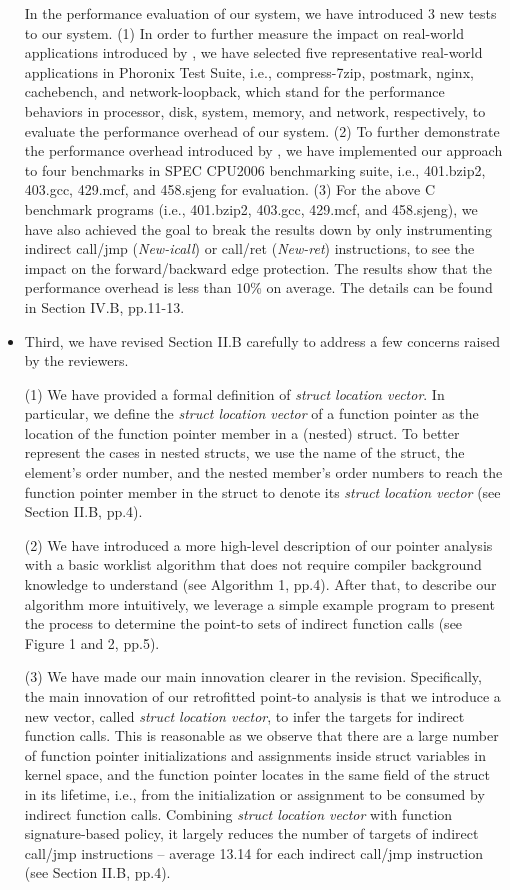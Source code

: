 \documentclass[oneside, 11pt]{article}
\begin{document}
\begin{itemize}
In the performance evaluation of our system, we have introduced 3 new
tests to our system. (1) In order to further measure the
impact on real-world applications introduced by \TheName{}, we have
selected five representative real-world applications in Phoronix Test
Suite, i.e., compress-7zip, postmark, nginx, cachebench, and network-loopback,
which stand for the performance behaviors in processor, disk, system, memory,
and network, respectively, to evaluate the performance overhead of our system.
(2) To further demonstrate the performance overhead introduced by \TheName{},
we have implemented our approach to four benchmarks in SPEC CPU2006 benchmarking
suite, i.e., 401.bzip2, 403.gcc, 429.mcf, and 458.sjeng for evaluation.
(3) For the above C benchmark programs (i.e., 401.bzip2, 403.gcc, 429.mcf, and 458.sjeng),
we have also achieved the goal to break the results down by only instrumenting
indirect call/jmp (\emph{New-icall}) or call/ret (\emph{New-ret}) instructions, to
see the impact on the forward/backward edge protection.
The results show that the performance overhead is less than $10$\% on average.
The details can be found in Section IV.B, pp.11-13.

\item %
Third, we have revised Section II.B carefully to address a few concerns raised by the reviewers.

(1) We have provided a formal definition of \emph{struct location vector}.
In particular, we define the \emph{struct location vector} of a function pointer
as the location of the function pointer member in a (nested) struct.
To better represent the cases in nested structs, we use the name of the
struct, the element's order number, and the nested member's order numbers
to reach the function pointer member in the struct to denote its
\emph{struct location vector} (see Section II.B, pp.4).

(2) We have introduced a more high-level description of our pointer
analysis with a basic worklist algorithm that does not require compiler
background knowledge to understand (see Algorithm 1, pp.4).
After that, to describe our algorithm more intuitively, we leverage a simple
example program to present the process to determine the point-to sets of
indirect function calls (see Figure 1 and 2, pp.5).

(3) We have made our main innovation clearer in the revision.
Specifically, the main innovation of our retrofitted point-to analysis is that
we introduce a new vector, called \emph{struct location vector}, to infer the
targets for indirect function calls. This is reasonable as we observe that
there are a large number of function pointer initializations and assignments inside
struct variables in kernel space, and the function pointer locates in the
same field of the struct in its lifetime, i.e., from the initialization or assignment to
be consumed by indirect function calls. Combining \emph{struct location vector}
with function signature-based policy, it largely reduces the number of targets
of indirect call/jmp instructions -- average 13.14 for each indirect call/jmp
instruction (see Section II.B, pp.4).


\end{itemize}
\end{document}
